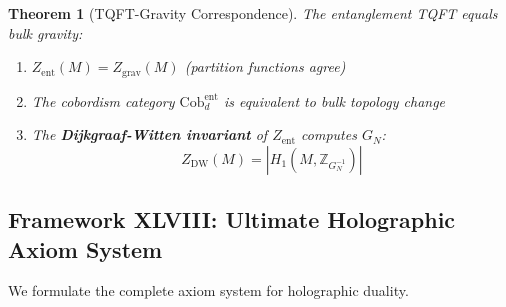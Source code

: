 \documentclass[12pt,a4paper]{article}
\newtheorem{theorem}{Theorem}[section]
\begin{document}
\begin{theorem}[TQFT-Gravity Correspondence]\label{thm:tqft-gravity}
The entanglement TQFT equals bulk gravity:
\begin{enumerate}
    \item $Z_{\text{ent}}(M) = Z_{\text{grav}}(M)$ (partition functions agree)
    \item The cobordism category $\text{Cob}_d^{\text{ent}}$ is equivalent to bulk topology change
    \item The \textbf{Dijkgraaf-Witten invariant} of $Z_{\text{ent}}$ computes $G_N$:
    \begin{equation}
    Z_{\text{DW}}(M) = |H_1(M, \mathbb{Z}_{G_N^{-1}})|
    \end{equation}
\end{enumerate}
\end{theorem}

\subsection{Framework XLVIII: Ultimate Holographic Axiom System}

We formulate the complete axiom system for holographic duality.
\end{document}
